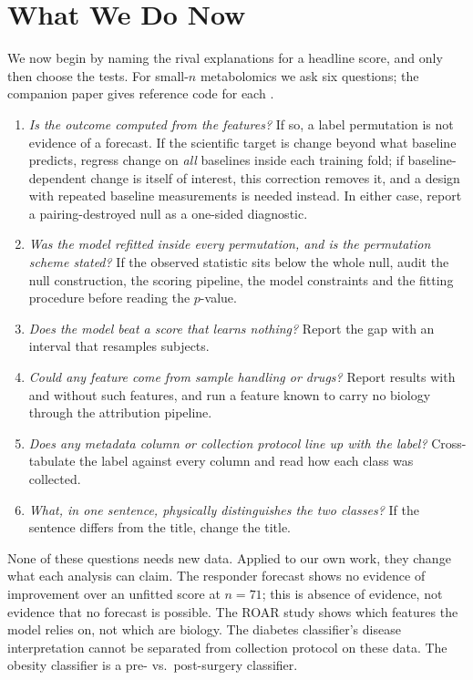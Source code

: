 \documentclass[conference]{IEEEtran}
\begin{document}
\section{What We Do Now}
\label{sec:practice}

We now begin by naming the rival explanations for a headline score, and only
then choose the tests. For small-$n$ metabolomics we ask six questions; the
companion paper gives reference code for each \cite{vyw}.

\begin{enumerate}
  \item \emph{Is the outcome computed from the features?} If so, a label
        permutation is not evidence of a forecast. If the scientific target
        is change beyond what baseline predicts, regress change on
        \emph{all} baselines inside each training fold; if baseline-dependent
        change is itself of interest, this correction removes it, and a
        design with repeated baseline measurements is needed instead. In
        either case, report a pairing-destroyed null as a one-sided
        diagnostic.
  \item \emph{Was the model refitted inside every permutation, and is the
        permutation scheme stated?} If the observed statistic sits below
        the whole null, audit the null construction, the scoring pipeline,
        the model constraints and the fitting procedure before reading the
        $p$-value.
  \item \emph{Does the model beat a score that learns nothing?} Report the
        gap with an interval that resamples subjects.
  \item \emph{Could any feature come from sample handling or drugs?} Report
        results with and without such features, and run a feature known to
        carry no biology through the attribution pipeline.
  \item \emph{Does any metadata column or collection protocol line up with
        the label?} Cross-tabulate the label against every column and read
        how each class was collected.
  \item \emph{What, in one sentence, physically distinguishes the two
        classes?} If the sentence differs from the title, change the title.
\end{enumerate}

None of these questions needs new data. Applied to our own work, they change
what each analysis can claim. The responder forecast shows no evidence of
improvement over an unfitted score at $n=71$; this is absence of evidence,
not evidence that no forecast is possible. The ROAR study shows which
features the model relies on, not which are biology. The diabetes
classifier's disease interpretation cannot be separated from collection
protocol on these data. The obesity classifier is a pre- vs.\ post-surgery
classifier.
\end{document}
